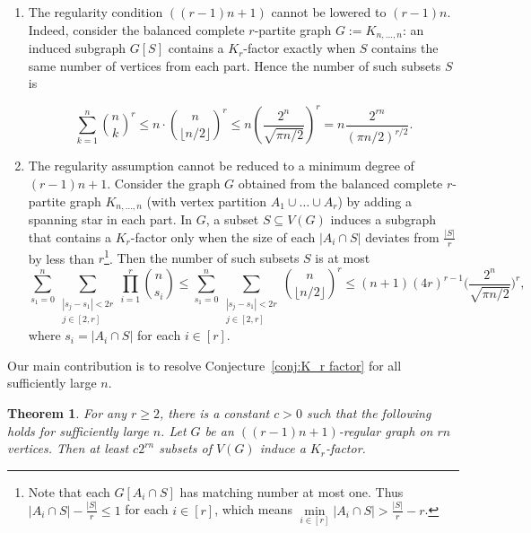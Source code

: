 \documentclass[11pt, a4paper]{article}
\newtheorem{theorem}{Theorem}[section]
\theoremstyle{definition}
\newcommand{\<}{\subseteq}
\begin{document}
\begin{enumerate}[label=(\arabic*)]
    \item The regularity condition $((r-1)n+1)$ cannot be lowered to $(r-1)n$.  
Indeed, consider the balanced complete $r$-partite graph $G:=K_{n,\ldots,n}$: an induced subgraph $G[S]$ contains a $K_r$-factor exactly when $S$ contains the same number of vertices from each part. Hence the number of such subsets $S$ is %

$$
\sum_{k=1}^n \binom{n}{k}^r \le n \cdot \binom{n}{\lfloor n/2 \rfloor}^r \leq n \left( \frac{2^n}{\sqrt{\pi n/2}} \right)^r =n\frac{2^{rn}}{(\pi n/2)^{r/2}}.
 $$
 \item The regularity assumption cannot be reduced to a minimum degree of $(r-1)n+1$. 
Consider the graph $G$ obtained from  the balanced complete $r$-partite graph $K_{n,\dots,n}$ (with vertex partition $A_1\cup \ldots \cup A_r$) by adding a spanning star  in each part.  
In $G$, a subset $S\subseteq V(G)$ induces a subgraph that contains a $K_r$-factor only when the size of %
each $|A_i\cap S|$ %
deviates from $\frac{|S|}{r}$ by less than  $r$\footnote{Note that each $G[A_i\cap S]$ has matching number at most one. Thus $|A_i\cap S|-\frac{|S|}{r}\leq 1$ for each $i\in [r]$, which means $\min\limits_{i\in[r]}|A_i\cap S|>\frac{|S|}{r}-r$.}. {Then the number of such subsets $S$ is at most
$$
\sum_{s_1=0}^n\sum_{\substack{|s_j-s_1|<2r\\j\in[2,r] }}\prod_{i=1}^r\binom{n}{s_i}\leq \sum_{s_1=0}^n\sum_{\substack{|s_j-s_1|<2r\\j\in[2,r] }}\binom{n}{\lfloor n/2 \rfloor}^r\leq (n+1)(4r)^{r-1}\Big( \frac{2^n}{\sqrt{\pi n/2}} \Big)^r, 
$$
where $s_i=|A_i\cap S|$ for each  $i\in [r]$. }

\end{enumerate}

Our main contribution is to resolve Conjecture~\ref{conj:K_r factor} for all sufficiently large $n$.

\begin{theorem}\label{thm:main thm}
For any $r\ge 2$, there is a constant $c>0$ such that the following holds for sufficiently large $n$. Let $G$ be an $((r-1)n+1)$-regular graph on $rn$ vertices. Then at least $c2^{rn}$ subsets of $V(G)$ induce a $K_r$-factor.
\end{theorem}
\end{document}
